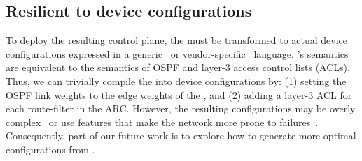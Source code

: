 \subsection{Resilient \ARCs to device configurations} \label{sec:configs}
To deploy the resulting control plane, the \ARC must be
transformed to actual device configurations expressed in a
generic~\cite{openconfig} or vendor-specific~\cite{ciscoios} language. \ARC's
semantics are equivalent to the semantics of OSPF and layer-3 access control
lists (ACLs). Thus, we can trivially compile the \ARC into device
configurations by: (1) setting the OSPF link weights to the edge weights of
the \ARC, and (2) adding a layer-3 ACL for each route-filter in the ARC.
However, the resulting configurations may be overly
complex~\cite{complexitymetrics} or use features that make the network more
prone to failures~\cite{mpa-imc15}. Consequently, part of our future work is to
explore how to generate more optimal configurations from \ARCs.

%
